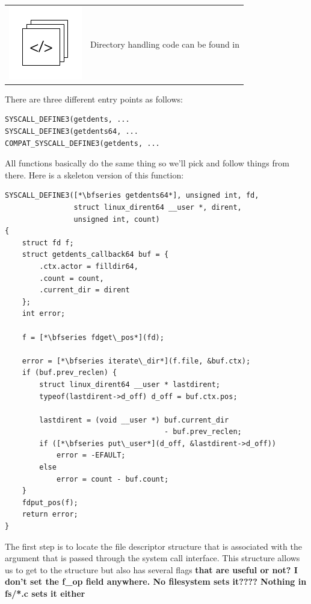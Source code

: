 \begin{table}[h]
\begin{tabular}{ll}
\parbox[l]{0.6in}{\includegraphics[scale=0.8]{figures/src-xref.pdf}} & \parbox[l]{4in}{\small{Directory handling code can be found in }}
\end{tabular}
\end{table}

\noindent
There are three different entry points as follows:

\begin{lstlisting}
SYSCALL_DEFINE3(getdents, ...
SYSCALL_DEFINE3(getdents64, ...
COMPAT_SYSCALL_DEFINE3(getdents, ...
\end{lstlisting}

\noindent
All functions basically do the same thing so we'll pick  and follow things from there. Here is a skeleton version of this function:

\begin{lstlisting}
SYSCALL_DEFINE3([*\bfseries getdents64*], unsigned int, fd,
                struct linux_dirent64 __user *, dirent, 
                unsigned int, count)
{
    struct fd f;
    struct getdents_callback64 buf = {
        .ctx.actor = filldir64,
        .count = count,
        .current_dir = dirent
    };
    int error;

    f = [*\bfseries fdget\_pos*](fd);

    error = [*\bfseries iterate\_dir*](f.file, &buf.ctx);
    if (buf.prev_reclen) {
        struct linux_dirent64 __user * lastdirent;
        typeof(lastdirent->d_off) d_off = buf.ctx.pos;

        lastdirent = (void __user *) buf.current_dir 
                                     - buf.prev_reclen;
        if ([*\bfseries put\_user*](d_off, &lastdirent->d_off))
            error = -EFAULT;
        else
            error = count - buf.count;
    }
    fdput_pos(f);
    return error;
}
\end{lstlisting}

\noindent
The first step is to locate the file descriptor structure that is associated with the argument  that is passed through the system call interface. This structure allows us to get to the  structure but also has several flags \textbf{that are useful or not? I don't set the f\_op field anywhere. No filesystem sets it???? Nothing in fs/*.c sets it either}

